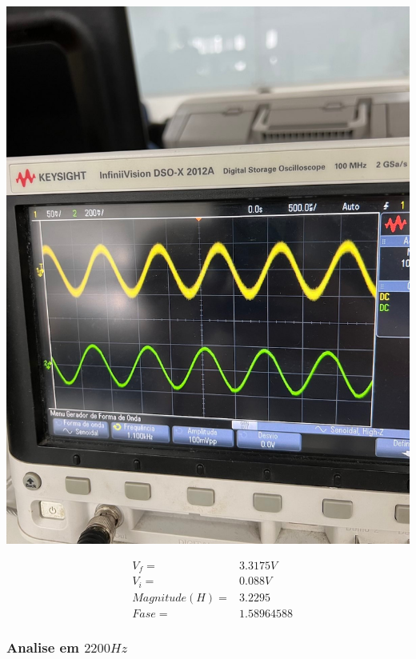 \documentclass[12pt,twoside, a4paper, twocolumn]{article}
\begin{document}
\begin{adjustbox}{scale=0.18}
    \includegraphics{freq1100.jpeg}
\end{adjustbox}

\begin{equation*}
    \begin{aligned}
         & V_f =          & 3.3175V    \\
         & V_i =          & 0.088V     \\
         & Magnitude(H) = & 3.2295     \\
         & Fase =         & 1.58964588
    \end{aligned}
\end{equation*}



\subsubsection{Analise em $2200Hz$}
\subparagraph*{}
\end{document}
